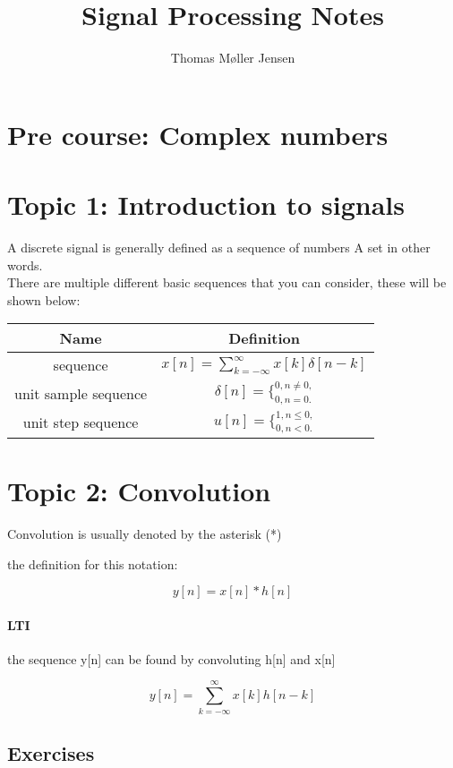 \documentclass{article}
\title{Signal Processing Notes}
\author{Thomas Møller Jensen}
\begin{document}
\maketitle
\section*{Pre course: Complex numbers}
\section*{Topic 1: Introduction to signals}
A discrete signal is generally defined as a sequence of numbers \- A set in other words.\\
There are multiple different basic sequences that you can consider, these will be shown below:
\begin{table}[H]
	\centering
	\begin{tabular}{|c|c|}
		\hline
		\textbf{Name} & \textbf{Definition} \\\hline
		sequence & $x[n]=\sum_{k=-\infty}^{\infty} x[k]\delta [n-k]$ \\\hline
		unit sample sequence & $\delta [n]=\{^{0, n\neq 0,}_{0, n = 0.}$ \\\hline
		unit step sequence & $u[n]=\{^{1, n \leq 0,}_{0, n<0.}$ \\\hline
	\end{tabular}
	
\end{table}

\section*{Topic 2: Convolution}
Convolution is usually denoted by the asterisk (*) 

the definition for this notation:

\begin{equation}
y[n]=x[n]*h[n]
\end{equation}

\paragraph{LTI}

the sequence y[n] can be found by convoluting h[n] and x[n]

\begin{equation}
y[n]=\sum_{k=-\infty}^{\infty}x[k]h[n-k]
\end{equation}
\subsection*{Exercises}
\end{document}

